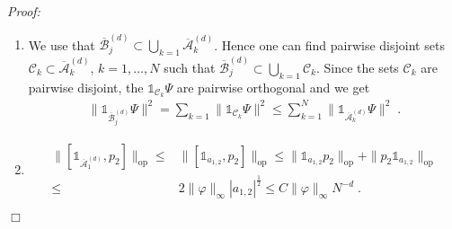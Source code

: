 \documentclass[11pt, english, american]{article}
\newcommand{\laa}{\langle\hspace{-0.08cm}\langle}
\newcommand{\raa}{\rangle\hspace{-0.08cm}\rangle}
\newenvironment{proof}{\emph{Proof:}}{\begin{flushright} $ \Box $ \end{flushright}}
\renewcommand{\phi}{\varphi}
\begin{document}
\begin{proof}
\begin{enumerate}
\begin{align*}
=\laa\Psi,\mathds{1}_{\overline{\mathcal{A}}^{(d)}_{1}}\Psi\raa
=
\int d^2 x_2\dots d^2x_N \int d^2x_1 |\Psi(x_1, \dots,x_N)|^2\mathds{1}_{\overline{\mathcal{A}}^{(d)}_{1}}(x_1,\dots,x_N)
\\
\leq &
\|\mathds{1}_{\overline{\mathcal{A}}^{(d)}_{1}} \|_{\frac{p}{p-1}, \infty} 
\int d^2 x_2\dots d^2x_N 
\left(
\int d^2x_1  |\Psi(x_1, \dots,x_N)|^{2p}
\right)^{1/p}
 \\
 \leq &
 C N^{(1-2d)\frac{p-1}{p}}
 \int d^2 x_2\dots d^2x_N 
\left(
\int d^2x_1  |\nabla_1 \Psi(x_1, \dots,x_N)|^{2}
\right)^{\frac{p-1}{p}}
\left(
\int d^2 \tilde{x}_1  | \Psi(\tilde{x}_1, \dots,x_N)|^{2}
\right)^{\frac{1}{p}}
\;.
 \end{align*}


Using  H\"older for the $x_2,\dots x_N$-integration with the conjugate pair $r= \frac{p}{p-1} $ and $s =p$, we obtain
\begin{align*}
 \|
\mathds{1}_{\overline{\mathcal{A}}^{(d)}_{1}}\Psi\|^2
\leq &
C N^{(1-2d)\frac{p-1}{p}}
\| \nabla_1 \Psi \|^{2\frac{p-1}{p}}
\| \Psi \|^{\frac{2}{p}} \;.
 \end{align*}
 Using $\|\nabla_1\Psi \|<C$, (b) follows.

 \item We use that $\overline{\mathcal{B}}^{(d)}_{j}\subset\bigcup_{k=1}\overline{\mathcal{A}}^{(d)}_{k}$.
Hence one can find pairwise disjoint sets $ \mathcal{C}_k\subset\overline{\mathcal{A}}^{(d)}_{k}$, $k=1,\ldots,N$
such that $\overline{\mathcal{B}}^{(d)}_{j}\subset\bigcup_{k=1} \mathcal{C}_{k}$. Since the sets $ \mathcal{C}_k$ are pairwise disjoint,
the $\mathds{1}_{ \mathcal{C}_{k}}\Psi $ are pairwise orthogonal and we get
\begin{align*}
\|\mathds{1}_{\overline{\mathcal{B}}^{(d)}_{j}}\Psi \|^2=\sum_{k=1}\|\mathds{1}_{ \mathcal{C}_{k}}\Psi \|^2
%
\leq \sum_{k=1}^N\|\mathds{1}_{\overline{\mathcal{A}}^{(d)}_{k}}\Psi \|^2 \;.
\end{align*}
\item
\begin{align*}
\|[\mathds{1}_{\overline{\mathcal{A}}^{(d)}_{1}},p_2]\|_{\text{op}} \leq &\|[\mathds{1}_{a_{1,2}},p_2]\|_{\text{op}}
\leq\|\mathds{1}_{a_{1,2}}p_2\|_{\text{op}}+\|p_2\mathds{1}_{a_{1,2}}\|_{\text{op}}
\\\leq &2\|\phi\|_\infty|a_{1,2}|^{\frac{1}{2}}\leq C \|\phi\|_\infty N^{-d}\;.
\end{align*}
\end{enumerate}
\end{proof}
\end{document}
